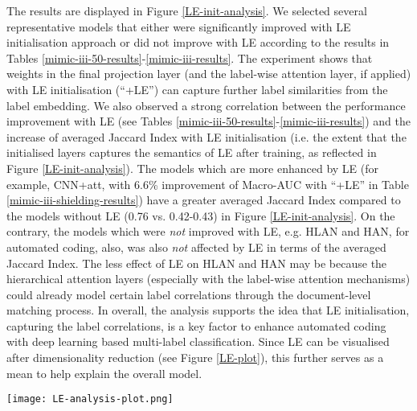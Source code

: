 \documentclass[final,5p,times,twocolumn]{elsarticle}
\begin{document}
The results are displayed in Figure \ref{LE-init-analysis}. We selected several representative models that either were significantly improved with LE initialisation approach or did not improve with LE according to the results in Tables \ref{mimic-iii-50-results}-\ref{mimic-iii-results}. The experiment shows that weights in the final projection layer (and the label-wise attention layer, if applied) with LE initialisation (``+LE'') can capture further label similarities from the label embedding. We also observed a strong correlation between the performance improvement with LE (see Tables \ref{mimic-iii-50-results}-\ref{mimic-iii-results}) and the increase of averaged Jaccard Index with LE initialisation (i.e. the extent that the initialised layers captures the semantics of LE after training, as reflected in Figure \ref{LE-init-analysis}). The models which are more enhanced by LE (for example, CNN+att, with 6.6\% improvement of Macro-AUC with ``+LE'' in Table \ref{mimic-iii-shielding-results}) have a greater averaged Jaccard Index compared to the models without LE (0.76 vs. 0.42-0.43) in Figure \ref{LE-init-analysis}. On the contrary, the models which were \textit{not} improved with LE, e.g. HLAN and HAN, for automated coding, also, was also \textit{not} affected by LE in terms of the averaged Jaccard Index. The less effect of LE on HLAN and HAN may be because the hierarchical attention layers (especially with the label-wise attention mechanisms) could already model certain label correlations through the document-level matching process. In overall, the analysis supports the idea that LE initialisation, capturing the label correlations, is a key factor to enhance automated coding with deep learning based multi-label classification. Since LE can be visualised after dimensionality reduction (see Figure \ref{LE-plot}), this further serves as a mean to help explain the overall model.

\begin{figure*}[h]
  \centering
  \texttt{[image: LE-analysis-plot.png]}
  \caption{Averaged Jaccard Index between the sets of top-10 similar labels derived from the layers (final projection layer and label-wise attention layers with or without label embedding initialisation) and from the label embedding (LE). The higher the averaged Jaccard Index, the more similar the overall semantics between the layer weights and the pre-trained label embedding. Error bars show the standard deviation over the labels. Representative models are selected for all the three datasets. ``+LE'' means label embedding initialised for the layer indicated in the closest left bar.
  }\label{LE-init-analysis}
\end{figure*}
\end{document}
